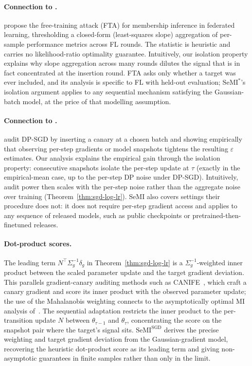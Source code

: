 \documentclass{article}
\theoremstyle{plain}
\theoremstyle{definition}
\theoremstyle{remark}
\newcommand{\SeMIstar}{\mathrm{SeMI}^{\ast}}
\begin{document}
\paragraph{Connection to \cite{chang2024efficient}.} \cite{chang2024efficient} propose the free-training attack (FTA) for membership inference in federated learning, thresholding a closed-form (least-squares slope) aggregation of per-sample performance metrics across FL rounds. The statistic is heuristic and carries no likelihood-ratio optimality guarantee. Intuitively, our isolation property explains why slope aggregation across many rounds dilutes the signal that is in fact concentrated at the insertion round. FTA asks only whether a target was ever included, and its analysis is specific to FL with held-out evaluation; $\SeMIstar$'s isolation argument applies to any sequential mechanism satisfying the Gaussian-batch model, at the price of that modelling assumption.

\paragraph{Connection to \cite{nasrTightAuditingDifferentially2023}.} \cite{nasrTightAuditingDifferentially2023} audit DP-SGD by inserting a canary at a chosen batch and showing empirically that observing per-step gradients or model snapshots tightens the resulting $\varepsilon$ estimates. Our analysis explains the empirical gain through the isolation property: consecutive snapshots isolate the per-step update at $\tau$ (exactly in the empirical-mean case, up to the per-step DP noise under DP-SGD). Intuitively, audit power then scales with the per-step noise rather than the aggregate noise over training (Theorem~\ref{thm:sgd-log-lr}). SeMI also covers settings their procedure does not: it does not require per-step gradient access and applies to any sequence of released models, such as public checkpoints or pretrained-then-finetuned releases.

\paragraph{Dot-product scores.} The leading term $N^\top \Sigma_g^{-1} \delta_g$ in Theorem~\ref{thm:sgd-log-lr} is a $\Sigma_g^{-1}$-weighted inner product between the scaled parameter update and the target gradient deviation. This parallels gradient-canary auditing methods such as CANIFE~\citep{maddockCANIFECraftingCanaries2023}, which craft a canary gradient and score its inner product with the observed parameter update; the use of the Mahalanobis weighting connects to the asymptotically optimal MI analysis of~\citep{azizeTargetsAreHarder2025}. The sequential adaptation restricts the inner product to the per-transition update $N$ between $\theta_{\tau-1}$ and $\theta_\tau$, concentrating the score on the snapshot pair where the target's signal sits. $\mathrm{SeMI}^{\mathrm{SGD}}$ derives the precise weighting and target gradient deviation from the Gaussian-gradient model, recovering the heuristic dot-product score as its leading term and giving non-asymptotic guarantees in finite samples rather than only in the limit.\newpage
\end{document}
